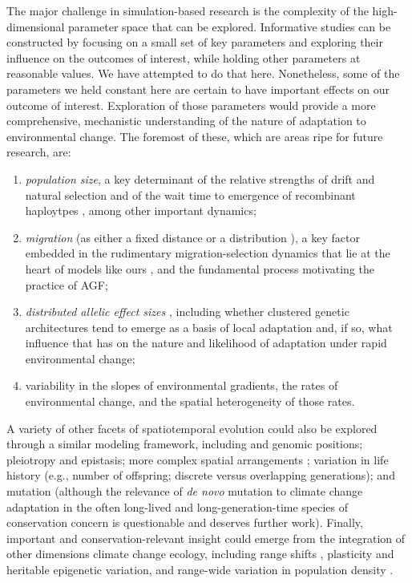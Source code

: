 \documentclass[9pt,twocolumn,twoside,lineno]{pnas-new}
\begin{document}
The major challenge in simulation-based research is the complexity of the high-dimensional 
parameter space that can be explored. Informative studies can be constructed by focusing on a 
small set of key parameters and exploring their influence
on the outcomes of interest, while holding other parameters at reasonable values. We have 
attempted to do that here. Nonetheless, some of the parameters we held constant here are certain 
to have important effects on our outcome of interest.
Exploration of those parameters would provide a more comprehensive,
mechanistic understanding of the nature of adaptation to environmental change. The foremost of these, 
which are areas ripe for future research, are:
    \begin{enumerate}
        \item \textit{population size}, a key determinant of the relative strengths of drift and natural selection \cite{murray} and of the wait time to emergence of recombinant haploytpes \cite{christiansen}, among other important dynamics;
        \item \textit{migration} (as either a fixed distance or a distribution \cite{paulose}), a key factor embedded in the rudimentary migration-selection dynamics that lie at the heart of models like ours \cite{wright,haldane,barton}, and the fundamental process motivating the practice of AGF;
        \item \textit{distributed allelic effect sizes} \cite{orr}, including whether clustered genetic architectures tend to emerge as a basis of local adaptation \cite{yeaman_whitlock} and, if so, what influence that has on the nature and likelihood of adaptation under rapid environmental change;
        \item variability in the slopes of environmental gradients, the rates of environmental change, and the spatial heterogeneity of those rates.
    \end{enumerate}
A variety of other facets of spatiotemporal evolution could also be explored 
through a similar modeling framework, including and genomic positions; 
pleiotropy \cite{thompson} and epistasis; more complex spatial 
arrangements \cite{benes};
variation in life history (e.g., number of offspring; discrete versus overlapping generations);
and mutation (although the relevance of \textit{de 
novo} mutation to climate change adaptation in the often long-lived 
and long-generation-time species of conservation concern is questionable
and deserves further work).
Finally, important and conservation-relevant insight could emerge from the 
integration of other dimensions climate change ecology, including range shifts 
\cite{weiss-lehman}, plasticity \cite{chevin} and heritable epigenetic variation,
and range-wide variation in population density \cite{aitken_whitlock}.
\end{document}
